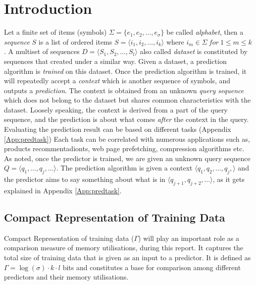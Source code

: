 \section{Introduction}
Let a finite set of items (symbols) \(\Sigma = \{e_1, e_2,\ldots,e_\sigma\}\) be called \emph{alphabet}, then a \emph{sequence} \(S\) is a list of ordered items \(S=\langle i_1,i_2,\ldots,i_k\rangle\) where \(i_m \in \Sigma\ for\ 1\leq m \leq k\). A multiset of sequences \(D = \langle S_1, S_2,\ldots,S_l\rangle\) also called \emph{dataset} is constituted by sequences that created under a similar way. Given a dataset, a prediction algorithm is \emph{trained} on this dataset.  Once the prediction algorithm is trained, it will repeatedly accept a \emph{context} which is another sequence of symbols, and outputs a \emph{prediction}. The context is obtained from an unknown \emph{query sequence} which does not belong to the dataset but shares common characteristics with the dataset.  Loosely speaking, the context is derived from a part of the query sequence, and the prediction is about what comes \emph{after} the context in the query. Evaluating the prediction result can be based on different tasks (Appendix \ref{App:predtask}) Each task can be correlated with numerous applications such as, products recommentadionts, web page prefetching, compression algorithms etc. As noted, once the predictor is trained, we are given an unknown query sequence \(Q = \langle q_1, \ldots, q_j, \ldots \rangle\).  The prediction algorithm is given a context \(\langle q_1, q_2,\ldots, q_j,\rangle\) and the predictor aims to say something about what is in \(\langle q_{j+1},q_{j+2},\ldots\rangle\), as it gets explained in Appendix \ref{App:predtask}.

\subsection*{Compact Representation of Training Data}
Compact Representation of training data (\(\Gamma\)) will play an important role as a comparison measure of memory utilisations, during this report. It captures the total size of training data that is given as an input to a predictor. It is defined as \(\Gamma = \log(\sigma) \cdot k \cdot l \) bits and constitutes a base for comparison among different predictors and their memory utilisations.

